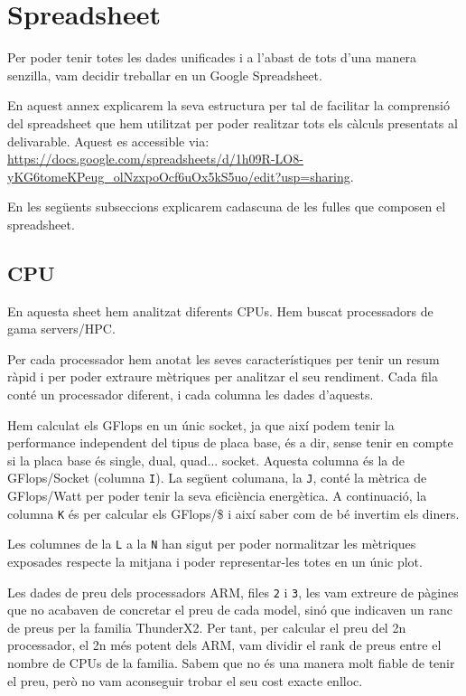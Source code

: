 \appendix
\section{Spreadsheet}
Per poder tenir totes les dades unificades i a l'abast de tots d'una manera senzilla, vam decidir treballar en un Google Spreadsheet. 

En aquest annex explicarem la seva estructura per tal de facilitar la comprensió del spreadsheet que hem utilitzat per poder realitzar tots els càlculs presentats al delivarable. Aquest es accessible via: \url{https://docs.google.com/spreadsheets/d/1h09R-LO8-yKG6tomeKPeug\_olNzxpoOcf6uOx5kS5uo/edit?usp=sharing}.

En les següents subseccions explicarem cadascuna de les fulles que composen el spreadsheet.

\subsection{CPU}
En aquesta sheet hem analitzat diferents CPUs. Hem buscat processadors de gama servers/HPC. 

Per cada processador hem anotat les seves característiques per tenir un resum ràpid i per poder extraure mètriques per analitzar el seu rendiment. Cada fila conté un processador diferent, i cada columna les dades d'aquests.

Hem calculat els GFlops en un únic socket, ja que així podem tenir la performance independent del tipus de placa base, és a dir, sense tenir en compte si la placa base és single, dual, quad... socket. 
Aquesta columna és la de GFlops/Socket (columna \texttt{I}). La següent columana, la \texttt{J}, conté la mètrica de GFlops/Watt per poder tenir la seva eficiència energètica. A continuació, la columna \texttt{K} és per calcular els GFlops/\$ i així saber com de bé invertim els diners.

Les columnes de la \texttt{L} a la \texttt{N} han sigut per poder normalitzar les mètriques exposades respecte la mitjana i poder representar-les totes en un únic plot.

Les dades de preu dels processadors ARM, files \texttt{2} i \texttt{3}, les vam extreure de pàgines que no acabaven de concretar el preu de cada model, sinó que indicaven un ranc de preus per la familia ThunderX2. Per tant, per calcular el preu del 2n processador, el 2n més potent dels ARM, vam dividir el rank de preus entre el nombre de CPUs de la familia. Sabem que no és una manera molt fiable de tenir el preu, però no vam aconseguir trobar el seu cost exacte enlloc.

